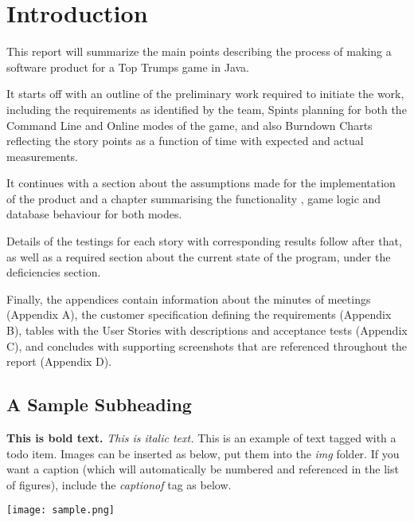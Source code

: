 \newpage
\section{Introduction}

This report will summarize the main points describing the process of making a software product for a Top Trumps game in Java.

It starts off with an outline of the preliminary work required to initiate the work, including the requirements as identified by the team, Spints planning for both the Command Line and Online modes of the game, and also Burndown Charts reflecting the story points as a function of time with expected and actual measurements.

It continues with a section about the assumptions made for the implementation of the product and a chapter summarising the functionality , game logic and database behaviour for both modes.

Details of the testings for each story with corresponding results follow after that, as well as a required section about the current state of the program, under the deficiencies section.

Finally, the appendices contain information about the minutes of meetings (Appendix A), the customer specification defining the requirements (Appendix B), tables with the User Stories with descriptions and acceptance tests (Appendix C), and concludes with supporting screenshots that are referenced throughout the report (Appendix D).

\subsection{A Sample Subheading}

\textbf{This is bold text.}
\emph{This is italic text.}
 This is an example of text tagged with a todo item.
Images can be inserted as below, put them into the \emph{img} folder.
If you want a caption (which will automatically be numbered and referenced in the list of figures), include the \emph{captionof} tag as below.

\begin{center}
	\texttt{[image: sample.png]}
\end{center}